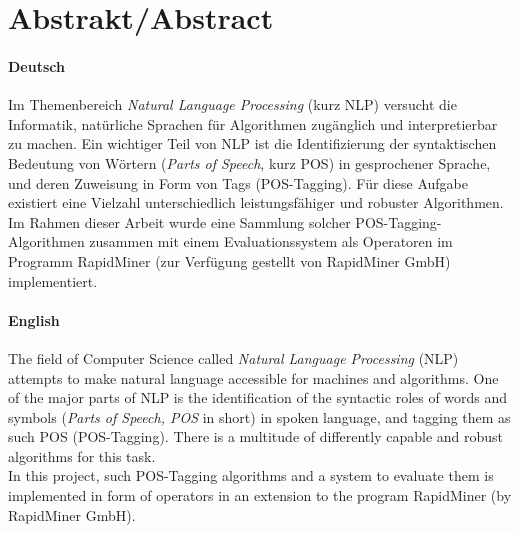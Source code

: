 %
\chapter*{Abstrakt/Abstract}
\label{sec:abstract}
\vspace*{-10mm}

\subsubsection{Deutsch}
Im Themenbereich \textit{Natural Language Processing} (kurz NLP) versucht die Informatik, natürliche Sprachen für Algorithmen zugänglich und interpretierbar zu machen. Ein wichtiger Teil von NLP ist die Identifizierung der syntaktischen Bedeutung von Wörtern (\textit{Parts of Speech}, kurz POS) in gesprochener Sprache, und deren Zuweisung in Form von Tags (POS-Tagging). Für diese Aufgabe existiert eine Vielzahl unterschiedlich leistungsfähiger und robuster Algorithmen.
\newline
Im Rahmen dieser Arbeit wurde eine Sammlung solcher POS-Tagging-Algorithmen zusammen mit einem Evaluationssystem als Operatoren im Programm RapidMiner (zur Verfügung gestellt von RapidMiner GmbH) implementiert.

\subsubsection{English}

The field of Computer Science called \textit{Natural Language Processing} (NLP) attempts to make natural language accessible for machines and algorithms. One of the major parts of NLP is the identification of the syntactic roles of words and symbols (\textit{Parts of Speech, POS} in short) in spoken language, and tagging them as such POS (POS-Tagging). There is a multitude of differently capable and robust algorithms for this task.
\\
In this project, such POS-Tagging algorithms and a system to evaluate them is implemented in form of operators in an extension to the program RapidMiner (by RapidMiner GmbH).
